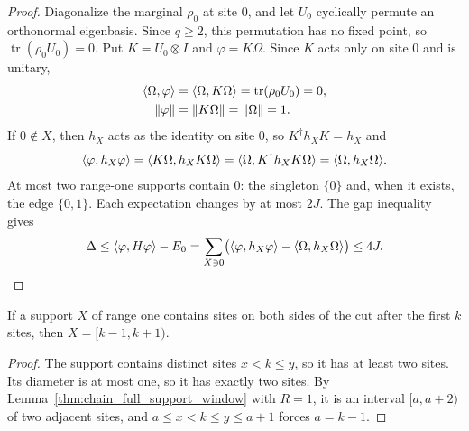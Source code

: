 \begin{proof}
    \leanok
    Diagonalize the marginal $\rho_0$ at site $0$, and let $U_0$ cyclically
    permute an orthonormal eigenbasis. Since $q\ge2$, this permutation has
    no fixed point, so $\operatorname{tr}(\rho_0U_0)=0$. Put $K=U_0\otimes I$
    and $\varphi=K\Omega$. Since $K$ acts only on site $0$ and is unitary,
    \begin{align}
        \langle\Omega,\varphi\rangle & =\langle\Omega,K\Omega\rangle
        =\operatorname{tr}(\rho_0U_0)=0,\notag                       \\
        \lVert\varphi\rVert          & =\lVert K\Omega\rVert
        =\lVert\Omega\rVert=1.\notag
    \end{align}
    If $0\notin X$, then $h_X$ acts as the identity on site $0$, so
    $K^\dagger h_XK=h_X$ and
    \begin{align}
        \langle\varphi,h_X\varphi\rangle
        =\langle K\Omega,h_XK\Omega\rangle
        =\langle\Omega,K^\dagger h_XK\Omega\rangle
        =\langle\Omega,h_X\Omega\rangle.\notag
    \end{align}
    At most two range-one supports contain $0$: the singleton $\{0\}$ and,
    when it exists, the edge $\{0,1\}$. Each expectation changes by at most
    $2J$. The gap inequality gives
    \begin{align}
        \Delta\le\langle\varphi,H\varphi\rangle-E_0
        =\sum_{X\ni0}\bigl(\langle\varphi,h_X\varphi\rangle
        -\langle\Omega,h_X\Omega\rangle\bigr)\le4J.\notag
    \end{align}
\end{proof}

\begin{lemma}
    \label{thm:chain_range_one_crossing_support}
    \leanok
    If a support $X$ of range one contains sites on both sides of the cut
    after the first $k$ sites, then $X=\lbrack k-1,k+1)$.
\end{lemma}
\begin{proof}\leanok
    The support contains distinct sites $x<k\le y$, so it has at least two
    sites. Its diameter is at most one, so it has exactly two sites. By
    Lemma~\ref{thm:chain_full_support_window} with $R=1$, it is an interval
    $\lbrack a,a+2)$ of two adjacent sites, and $a\le x<k\le y\le a+1$ forces
    $a=k-1$.
\end{proof}

